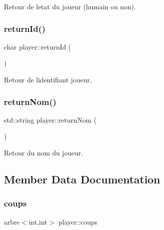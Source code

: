 Retour de l\textquotesingle{}etat du joueur (humain ou non). 

\mbox{\label{classplayer_a6e4d00a9bdc81a1c4bc7cc5aef766510}} 
\subsubsection{\texorpdfstring{return\+Id()}{returnId()}}
{\footnotesize\ttfamily char player\+::return\+Id (\begin{DoxyParamCaption}{ }\end{DoxyParamCaption})\hspace{0.3cm}{\ttfamily [inline]}}



Retour de l\textquotesingle{}identifiant joueur. 

\mbox{\label{classplayer_ada00e16c16ff0be00896b1f6df9a21de}} 
\subsubsection{\texorpdfstring{return\+Nom()}{returnNom()}}
{\footnotesize\ttfamily std\+::string player\+::return\+Nom (\begin{DoxyParamCaption}{ }\end{DoxyParamCaption})\hspace{0.3cm}{\ttfamily [inline]}}



Retour du nom du joueur. 



\subsection{Member Data Documentation}
\mbox{\label{classplayer_a5386c8bc522c5c0e39b1e071cf9ca37a}} 
\subsubsection{\texorpdfstring{coups}{coups}}
{\footnotesize\ttfamily arbre$<$int,int$>$ player\+::coups\hspace{0.3cm}{\ttfamily [private]}}



